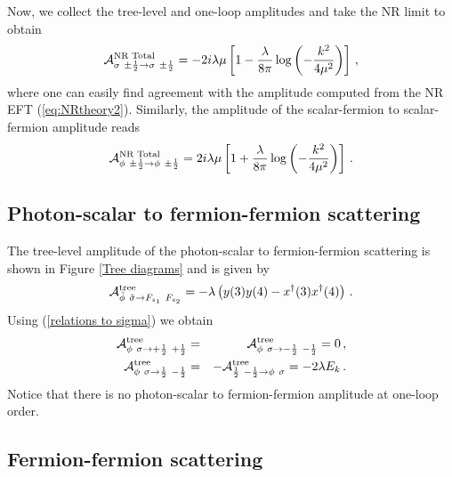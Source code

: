 \documentclass[11pt]{article}
\begin{document}
Now, we collect the tree-level and one-loop amplitudes and take the NR limit to obtain
%
\begin{eqnarray}
{\cal A}^{\scriptsize\mbox{NR Total}}_{\sigma~\pm\frac{1}{2}\rightarrow \sigma~\pm\frac{1}{2}}=-2i\lambda\mu \left[1-\frac{\lambda}{8\pi}\log\left(-\frac{k^2}{4\mu^2}\right) \right]\,,
\end{eqnarray}
where one can easily find agreement with the amplitude computed from the NR EFT (\ref{eq:NRtheory2}).%
 Similarly, the amplitude of the scalar-fermion to scalar-fermion amplitude reads
%
\begin{eqnarray}
{\cal A}^{\scriptsize\mbox{NR Total}}_{\phi~\pm\frac{1}{2}\rightarrow \phi~\pm\frac{1}{2}}=2i\lambda\mu \left[1+\frac{\lambda}{8\pi}\log\left(-\frac{k^2}{4\mu^2}\right) \right]\,.
\end{eqnarray}
%


\subsection*{Photon-scalar to fermion-fermion scattering}

The tree-level amplitude of the photon-scalar to fermion-fermion scattering is shown in Figure \ref{Tree diagrams} and is given by
%
\begin{eqnarray}
{\cal A}^{\scriptsize\mbox{tree}}_{\tilde\phi~\tilde\sigma \rightarrow F_{s_1}~F_{s_2}}=-\lambda \left(y(3)y(4)- x^\dagger(3) x^\dagger(4)\right)\,.
\label{vertex of scattering of sigma phi into fermions}
\end{eqnarray}
%
Using (\ref{relations to sigma}) we obtain
%
\begin{eqnarray}
\nonumber
{\cal A}^{\scriptsize\mbox{tree}}_{\phi~\sigma \rightarrow +\frac{1}{2}~+\frac{1}{2}}&=& {\cal A}^{\scriptsize\mbox{tree}}_{\phi~\sigma \rightarrow -\frac{1}{2}~-\frac{1}{2}}=0\,,\\
{\cal A}^{\scriptsize\mbox{tree}}_{\phi~\sigma \rightarrow \frac{1}{2}~-\frac{1}{2}}&=&-{\cal A}^{\scriptsize\mbox{tree}}_{ \frac{1}{2}~-\frac{1}{2}\rightarrow \phi~\sigma}=-2\lambda  E_k\,.
\label{photon scalar to fermion-fermion}
\end{eqnarray}
%
Notice that there is no photon-scalar to fermion-fermion amplitude at one-loop order.

\subsection*{Fermion-fermion scattering}
\end{document}
